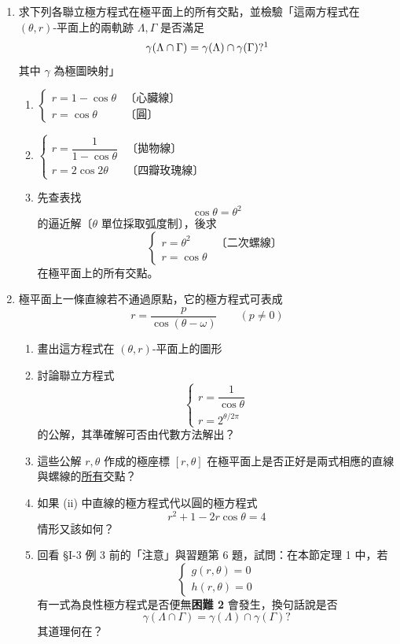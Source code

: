 \begin{enumerate}[label=\arabic*., leftmargin=2em]
\item 求下列各聯立極方程式在極平面上的所有交點，並檢驗「這兩方程式在 $(\theta, r)$-平面上的兩軌跡 $\Lambda, \Gamma$ 是否滿足
\[
\gamma(\Lambda \cap \Gamma) = \gamma(\Lambda) \cap \gamma(\Gamma)?\footnotemark
\]
\label{note:b5-ch1-p44-paren}
其中 $\gamma$ 為極圖映射」
\begin{enumerate}[label=(\roman*)]
\item $\begin{cases} r = 1 - \cos\theta & \text{〔心臟線〕} \\[4pt] r = \cos\theta & \text{〔圓〕} \end{cases}$
\item $\begin{cases} r = \dfrac{1}{1 - \cos\theta} & \text{〔拋物線〕} \\[8pt] r = 2\cos 2\theta & \text{〔四瓣玫瑰線〕} \end{cases}$
\item 先查表找
\[
\cos\theta = \theta^2
\]
的逼近解〔$\theta$ 單位採取弧度制〕，後求
\[
\begin{cases}
r = \theta^2 & \text{〔二次螺線〕} \\[4pt]
r = \cos\theta
\end{cases}
\]
在極平面上的所有交點。
\end{enumerate}

\item 極平面上一條直線若不通過原點，它的極方程式可表成
\[
r = \frac{p}{\cos(\theta - \omega)} \qquad (p \neq 0)
\]
\begin{enumerate}[label=(\roman*)]
\item 畫出這方程式在 $(\theta, r)$-平面上的圖形
\item 討論聯立方程式
\[
\begin{cases}
r = \dfrac{1}{\cos\theta} \\[8pt]
r = 2^{\theta / 2\pi}
\end{cases}
\]
的公解，其準確解可否由代數方法解出？
\item 這些公解 $r, \theta$ 作成的極座標 $[r, \theta]$ 在極平面上是否正好是兩式相應的直線與螺線的\underline{所有}交點？
\item 如果 (ii) 中直線的極方程式代以圓的極方程式
\[
r^2 + 1 - 2r\cos\theta = 4
\]
情形又該如何？
\item 回看 \S I-3 例 3 前的「注意」與習題第 6 題，試問：在本節定理 1 中，若
\[
\begin{cases}
g(r, \theta) = 0 \\[4pt]
h(r, \theta) = 0
\end{cases}
\]
有一式為良性極方程式是否便無\textbf{困難 2} 會發生，換句話說是否
\[
\gamma(\Lambda \cap \Gamma) = \gamma(\Lambda) \cap \gamma(\Gamma)?
\]
其道理何在？
\end{enumerate}


\end{enumerate}
